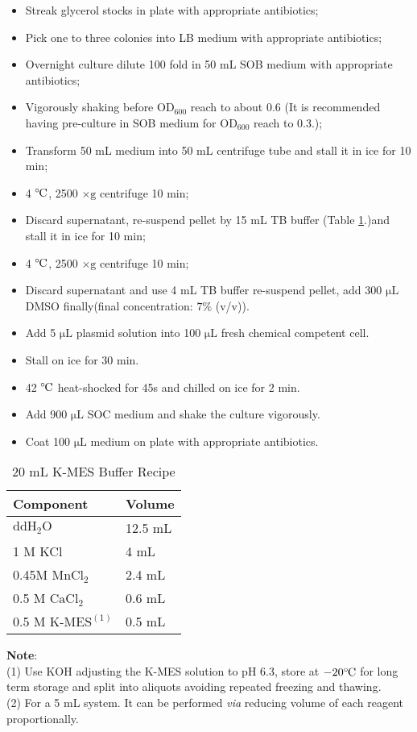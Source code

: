 \documentclass[a4paper, twocolumn]{article}
\def\celsius{\ensuremath{^\circ\hspace{-0.09em}\mathrm{C}}}
\newcommand{\ul}{\mathrm{\mu L}}
\begin{document}
\begin{itemize}
    \item Streak glycerol stocks in plate with appropriate antibiotics;
    \item Pick one to three colonies into LB medium with appropriate antibiotics;
    \item Overnight culture dilute 100 fold in 50 mL SOB medium with appropriate antibiotics;
    \item Vigorously shaking before $\mathrm{OD_{600}}$ reach to about 0.6 (It is recommended having pre-culture in SOB medium for $\mathrm{OD_{600}}$ reach to 0.3.);
    \item Transform 50 mL medium into 50 mL centrifuge tube and stall it in ice for 10 min;
    \item 4 $\celsius$, 2500 $\mathrm{\times g}$ centrifuge 10 min;
    \item Discard supernatant, re-suspend pellet by 15 mL TB buffer (Table \ref{ta1}.)and stall it in ice for 10 min;
    \item 4 $\celsius$, 2500 $\mathrm{\times g}$ centrifuge 10 min;
    \item Discard supernatant and use 4 mL TB buffer re-suspend pellet, add 300 $\mathrm{\mu L}$ DMSO finally(final concentration: $7\%$ (v/v)).
    \item Add 5 $\ul$  plasmid solution into 100 $\ul$ fresh chemical competent cell.
    \item Stall on ice for 30 min.
    \item 42 $\celsius$ heat-shocked for 45s and chilled on ice for 2 min.
    \item Add 900 $\ul$ SOC medium and shake the culture vigorously.
    \item Coat 100 $\ul$ medium on plate with appropriate antibiotics.
\end{itemize}

\begin{table}[H]
    \centering
    \begin{tabular}{ll}
        \toprule
        Component & Volume \\
        \midrule
        $\mathrm{ddH_2O}$ & 12.5 mL \\
        1 M KCl & 4 mL \\
        0.45M $\mathrm{MnCl_2} $ & 2.4 mL \\
        0.5 M $\mathrm{CaCl_2}$ & 0.6 mL \\
        0.5 M $\textrm{K-MES}^{(1)}$ & 0.5 mL  \\
        \bottomrule
    \end{tabular}
    \caption{20 mL K-MES Buffer Recipe} 
    \label{ta1}
\end{table}
\textbf{Note}: \\
(1) Use KOH adjusting the K-MES solution to pH 6.3, store at $- 20 \celsius$ for long term storage and split into aliquots avoiding repeated freezing and thawing. \\
(2) For a 5 mL system. It can be performed \emph{via} reducing volume of each reagent proportionally. 
 



\end{document}
